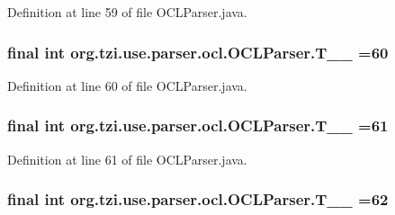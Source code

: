 Definition at line 59 of file O\-C\-L\-Parser.\-java.

\hypertarget{classorg_1_1tzi_1_1use_1_1parser_1_1ocl_1_1_o_c_l_parser_af012643bfc760d35224ec8e0766f9e00}{
\subsubsection[{T\-\_\-\-\_\-60}]{\setlength{\rightskip}{0pt plus 5cm}final int org.\-tzi.\-use.\-parser.\-ocl.\-O\-C\-L\-Parser.\-T\-\_\-\-\_ =60\hspace{0.3cm}{\ttfamily [static]}}}\label{classorg_1_1tzi_1_1use_1_1parser_1_1ocl_1_1_o_c_l_parser_af012643bfc760d35224ec8e0766f9e00}


Definition at line 60 of file O\-C\-L\-Parser.\-java.

\hypertarget{classorg_1_1tzi_1_1use_1_1parser_1_1ocl_1_1_o_c_l_parser_a50ce02ef7ba8f4168d14c077e619112a}{
\subsubsection[{T\-\_\-\-\_\-61}]{\setlength{\rightskip}{0pt plus 5cm}final int org.\-tzi.\-use.\-parser.\-ocl.\-O\-C\-L\-Parser.\-T\-\_\-\-\_ =61\hspace{0.3cm}{\ttfamily [static]}}}\label{classorg_1_1tzi_1_1use_1_1parser_1_1ocl_1_1_o_c_l_parser_a50ce02ef7ba8f4168d14c077e619112a}


Definition at line 61 of file O\-C\-L\-Parser.\-java.

\hypertarget{classorg_1_1tzi_1_1use_1_1parser_1_1ocl_1_1_o_c_l_parser_ac147a116cd8e9b9cab90d297fd253623}{
\subsubsection[{T\-\_\-\-\_\-62}]{\setlength{\rightskip}{0pt plus 5cm}final int org.\-tzi.\-use.\-parser.\-ocl.\-O\-C\-L\-Parser.\-T\-\_\-\-\_ =62\hspace{0.3cm}{\ttfamily [static]}}}\label{classorg_1_1tzi_1_1use_1_1parser_1_1ocl_1_1_o_c_l_parser_ac147a116cd8e9b9cab90d297fd253623}


